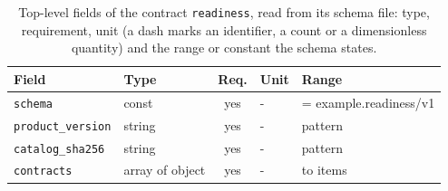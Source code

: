 \begin{table}[t]\centering\footnotesize
\caption{Top-level fields of the contract \texttt{readiness}, read from its schema file: type, requirement, unit (a dash marks an identifier, a count or a dimensionless quantity) and the range or constant the schema states.}\label{tab:contract-readiness}
\begin{tabular}{@{}l l c l >{\raggedright\arraybackslash}p{}@{}}\toprule Field & Type & Req. & Unit & Range\\\midrule
\texttt{\scriptsize schema} & const & yes & - & = example.readiness/v1\\
\texttt{\scriptsize product\_version} & string & yes & - & pattern\\
\texttt{\scriptsize catalog\_sha256} & string & yes & - & pattern\\
\texttt{\scriptsize contracts} & array of object & yes & - & 1 to items\\
\bottomrule\end{tabular}\end{table}
